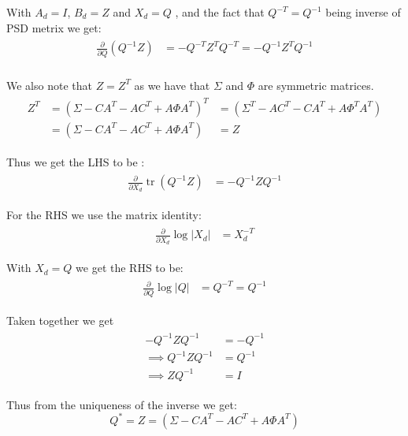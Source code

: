 \documentclass{tufte-handout}
\begin{document}
\begin{enumerate}[(a)]
    With $A_d = I$, $B_d = Z$ and $X_d = Q$ , and the fact that $Q^{-T} = Q^{-1}$ being inverse of PSD metrix we get:
   \begin{multline} 
    \begin{aligned}
        \frac{\partial}{\partial Q} (Q^{-1}Z) &= -Q^{-T}Z^T Q^{-T}  = - Q^{-1} Z^T Q^{-1}\\
    \end{aligned}
   \end{multline}

   We also note that $Z = Z^T$  as we have that $\Sigma$ and $\Phi$ are symmetric matrices.
   \begin{multline}
    \begin{aligned}
        Z^T &= (\Sigma - CA^T - AC^T + A \Phi A^T )^T &=  (\Sigma^T  - AC^T - C A^T  + A \Phi^T A^T)\\
        & = (\Sigma - CA^T - AC^T + A \Phi A^T ) &= Z 
    \end{aligned} 
 \end{multline}

Thus we get the LHS to be :
    \begin{multline}
        \begin{aligned}
            \frac{\partial}{\partial X_d} \operatorname{tr}(Q^{-1}Z) &= -Q^{-1} Z Q^{-1} 
        \end{aligned}
    \end{multline} 

For the RHS we use the matrix identity:
\begin{multline}
    \begin{aligned}
        \frac{\partial}{\partial X_d} \log |X_d| &= X_d^{-T}
    \end{aligned}
\end{multline}

With $X_d = Q$ we get the RHS to be:
\begin{multline}
    \begin{aligned}
        \frac{\partial}{\partial Q} \log |Q| &= Q^{-T} = Q^{-1}
    \end{aligned}
\end{multline}

Taken together we get 
\begin{multline}
    \begin{aligned}
    -Q^{-1} Z Q^{-1} &= -Q^{-1} \\
    \implies Q^{-1} Z Q^{-1} &= Q^{-1}  \\
    \implies Z Q^{-1} &= I 
    \end{aligned}
\end{multline}


Thus from the uniqueness of the inverse we get:
\begin{equation}
    Q^{*} = Z = (\Sigma - CA^T - AC^T + A \Phi A^T)
\end{equation}

\end{enumerate}



\end{document}
